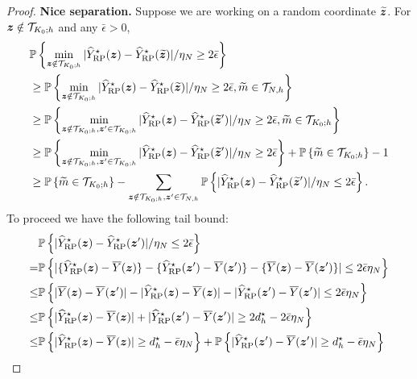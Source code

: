 \documentclass[12pt]{article}
\begin{document}
\begin{proof}
\textbf{Nice separation.} Suppose we are working on a random coordinate $\widetilde{{\boldsymbol{z}}}$. For ${\boldsymbol{z}}\notin {\mathcal{T}}_{K_0;h}$ and any $\bar{\epsilon}>0$, 
\begin{align}
    &{\mathbb{P}}\left\{\min_{{\boldsymbol{z}}\notin {\mathcal{T}}_{K_0;h}}|{\widehat{Y}}^\star_{\operatorname{RP}}({\boldsymbol{z}}) - {\widehat{Y}}^\star_{\operatorname{RP}}(\widetilde{{\boldsymbol{z}}})|/\eta_N \ge 2\bar{\epsilon}\right\} \notag\\
    & \ge {\mathbb{P}}\left\{\min_{{\boldsymbol{z}}\notin {\mathcal{T}}_{K_0;h}}|{\widehat{Y}}^\star_{\operatorname{RP}}({\boldsymbol{z}}) - {\widehat{Y}}^\star_{\operatorname{RP}}(\widetilde{{\boldsymbol{z}}})|/\eta_N \ge 2\bar{\epsilon}, \widetilde{m}\in {\mathcal{T}}_{N,h}\right\}\notag\\
    & \ge {\mathbb{P}}\left\{\min_{{\boldsymbol{z}}\notin {\mathcal{T}}_{K_0;h}, {\boldsymbol{z}}'\in {\mathcal{T}}_{K_0;h}}|{\widehat{Y}}^\star_{\operatorname{RP}}({\boldsymbol{z}}) - {\widehat{Y}}^\star_{\operatorname{RP}}(\widetilde{{\boldsymbol{z}}}')|/\eta_N \ge 2\bar{\epsilon}, \widetilde{m}\in {\mathcal{T}}_{K_0;h}\right\}\notag\\
    & \ge {\mathbb{P}}\left\{\min_{{\boldsymbol{z}}\notin {\mathcal{T}}_{K_0;h}, {\boldsymbol{z}}'\in {\mathcal{T}}_{K_0;h}}|{\widehat{Y}}^\star_{\operatorname{RP}}({\boldsymbol{z}}) - {\widehat{Y}}^\star_{\operatorname{RP}}(\widetilde{{\boldsymbol{z}}}')|/\eta_N \ge 2\bar{\epsilon}\right\} + {\mathbb{P}}\left\{\widetilde{m}\in {\mathcal{T}}_{K_0;h}\right\} - 1\notag\\
    & \ge {\mathbb{P}}\left\{\widetilde{m}\in {\mathcal{T}}_{K_0;h}\right\} - \sum_{{\boldsymbol{z}}\notin {\mathcal{T}}_{K_0;h}, {\boldsymbol{z}}'\in{\mathcal{T}}_{N,h}}{\mathbb{P}}\left\{|{\widehat{Y}}^\star_{\operatorname{RP}}({\boldsymbol{z}}) - {\widehat{Y}}^\star_{\operatorname{RP}}(\widetilde{{\boldsymbol{z}}}')|/\eta_N \le 2\bar{\epsilon}\right\}. \label{eqn:separation-1-1}
\end{align}
To proceed we have the following tail bound:
\begin{align*}
    & \bbP\lt\{|\hY^\star_{\operatorname{RP}}(\bz) - \hY^\star_{\operatorname{RP}}(\bz')|/\eta_N \le 2\bar{\epsilon}\rt\} \\
    = & \bbP\lt\{|\{\hY^\star_{\operatorname{RP}}(\bz)-\overline{Y}(\bz)\} - \{\hY^\star_{\operatorname{RP}}(\bz')-\overline{Y}(\bz')\} - \{\overline{Y}(\bz)-\overline{Y}(\bz')\}| \le 2\bar{\epsilon}\eta_N\rt\}\\
    \le &  \bbP\lt\{|\overline{Y}(\bz)-\overline{Y}(\bz')|-|\hY^\star_{\operatorname{RP}}(\bz)-\overline{Y}(\bz)| - |\hY^\star_{\operatorname{RP}}(\bz')-\overline{Y}(\bz')| \le 2\bar{\epsilon}\eta_N\rt\}\\
    \le & \bbP\lt\{|\hY^\star_{\operatorname{RP}}(\bz)-\overline{Y}(\bz)| + |\hY^\star_{\operatorname{RP}}(\bz')-\overline{Y}(\bz')|\ge 2d_h^\star - 2\bar{\epsilon}\eta_N \rt\}\\
    \le & \bbP\lt\{|\hY^\star_{\operatorname{RP}}(\bz)-\overline{Y}(\bz)|\ge  {d_h^\star - \bar{\epsilon}\eta_N} \rt\} + \bbP\lt\{|\hY^\star_{\operatorname{RP}}(\bz')-\overline{Y}(\bz')|\ge {d_h^\star - \bar{\epsilon}\eta_N} \rt\} \\

\end{align*}
\end{proof}
\end{document}
